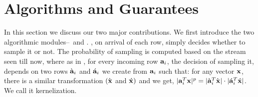 \section{Algorithms and Guarantees}
{\label{sec:algorithms}}
In this section we discuss our two major contributions. We first introduce the two algorithmic modules--\online~and . \online, on arrival of each row, simply decides whether to sample it or not. The probability of sampling is computed based on the stream seen till now,
where as in , for every incoming row $\mathbf{a}_i$, the decision of sampling it, depends on two rows $\grave{\mathbf{a}}_{i}$ and $\acute{\mathbf{a}}_{i}$ we create from $\mathbf{a}_{i}$
such that: for any vector $\mathbf{x}$, there is a similar transformation $(\grave{\mathbf{x}}$ and $\acute{\mathbf{x}})$ and we get, $|\mathbf{a}_{i}^{T}\mathbf{x}|^{p} = |\grave{\mathbf{a}}_{i}^{T}\grave{\mathbf{x}}|\cdot|\acute{\mathbf{a}}_{i}^{T}\acute{\mathbf{x}}|$. We call it kernelization.

